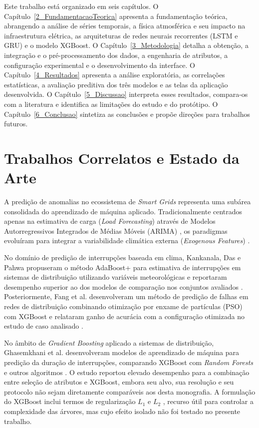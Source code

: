 Este trabalho está organizado em seis capítulos. O Capítulo~\ref{2_FundamentacaoTeorica} apresenta a fundamentação teórica, abrangendo a análise de séries temporais, a física atmosférica e seu impacto na infraestrutura elétrica, as arquiteturas de redes neurais recorrentes (LSTM e GRU) e o modelo XGBoost. O Capítulo~\ref{3_Metodologia} detalha a obtenção, a integração e o pré-processamento dos dados, a engenharia de atributos, a configuração experimental e o desenvolvimento da interface. O Capítulo~\ref{4_Resultados} apresenta a análise exploratória, as correlações estatísticas, a avaliação preditiva dos três modelos e as telas da aplicação desenvolvida. O Capítulo~\ref{5_Discussao} interpreta esses resultados, compara-os com a literatura e identifica as limitações do estudo e do protótipo. O Capítulo~\ref{6_Conclusao} sintetiza as conclusões e propõe direções para trabalhos futuros.

\section{Trabalhos Correlatos e Estado da Arte}\label{sec:estadodaarte}

A predição de anomalias no ecossistema de \textit{Smart Grids} representa uma subárea consolidada do aprendizado de máquina aplicado. Tradicionalmente centrados apenas na estimativa de carga (\textit{Load Forecasting}) através de Modelos Autorregressivos Integrados de Médias Móveis (ARIMA) \cite{box2015time}, os paradigmas evoluíram para integrar a variabilidade climática externa (\textit{Exogenous Features}) \cite{hyndman2018forecasting}.

No domínio de predição de interrupções baseada em clima, Kankanala, Das e Pahwa propuseram o método AdaBoost+ para estimativa de interrupções em sistemas de distribuição utilizando variáveis meteorológicas e reportaram desempenho superior ao dos modelos de comparação nos conjuntos avaliados \cite{roque2017weather}. Posteriormente, Fang et al. desenvolveram um método de predição de falhas em redes de distribuição combinando otimização por enxame de partículas (PSO) com XGBoost e relataram ganho de acurácia com a configuração otimizada no estudo de caso analisado \cite{saha2019machine}.

No âmbito de \textit{Gradient Boosting} aplicado a sistemas de distribuição, Ghasemkhani et al. desenvolveram modelos de aprendizado de máquina para predição da duração de interrupções, comparando XGBoost com \textit{Random Forests} e outros algoritmos \cite{silva2021xgboost, breiman2001random}. O estudo reportou elevado desempenho para a combinação entre seleção de atributos e XGBoost, embora seu alvo, sua resolução e seu protocolo não sejam diretamente comparáveis aos desta monografia. A formulação do XGBoost inclui termos de regularização $L_1$ e $L_2$ \cite{chen2016xgboost}, recurso útil para controlar a complexidade das árvores, mas cujo efeito isolado não foi testado no presente trabalho.

